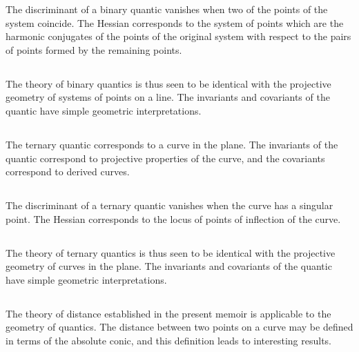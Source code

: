 \documentclass[11pt,a4paper]{book}
\begin{document}
\begin{center}
The discriminant of a binary quantic vanishes when two of the points of the system coincide. The Hessian corresponds to the system of points which are the harmonic conjugates of the points of the original system with respect to the pairs of points formed by the remaining points.

\subsection{}

The theory of binary quantics is thus seen to be identical with the projective geometry of systems of points on a line. The invariants and covariants of the quantic have simple geometric interpretations.

\subsection{}

The ternary quantic corresponds to a curve in the plane. The invariants of the quantic correspond to projective properties of the curve, and the covariants correspond to derived curves.

\subsection{}

The discriminant of a ternary quantic vanishes when the curve has a singular point. The Hessian corresponds to the locus of points of inflection of the curve.

\subsection{}

The theory of ternary quantics is thus seen to be identical with the projective geometry of curves in the plane. The invariants and covariants of the quantic have simple geometric interpretations.

\subsection{}

The theory of distance established in the present memoir is applicable to the geometry of quantics. The distance between two points on a curve may be defined in terms of the absolute conic, and this definition leads to interesting results.

\subsection{}


\end{center}
\end{document}

